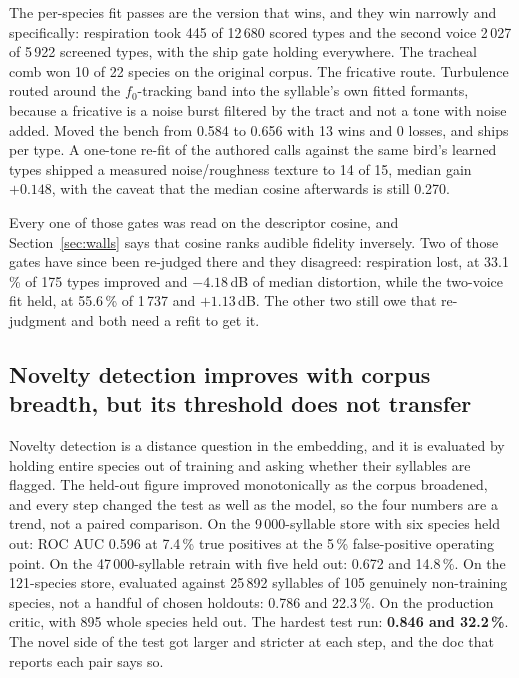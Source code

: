 \documentclass[10pt,twocolumn,a4paper]{article}
\begin{document}
The per-species fit passes are the version that wins, and they win narrowly and
specifically: respiration took 445 of 12\,680 scored types and the second voice 2\,027 of
5\,922 screened types, with the ship gate holding everywhere. The tracheal comb won 10 of 22
species on the original corpus. The fricative route. Turbulence routed around the
$f_0$-tracking band into the syllable's own fitted formants, because a fricative is a noise
burst filtered by the tract and not a tone with noise added. Moved the bench from 0.584 to
0.656 with 13 wins and 0 losses, and ships per type. A one-tone re-fit of the authored calls
against the same bird's learned types shipped a measured noise/roughness texture to 14 of 15,
median gain $+0.148$, with the caveat that the median cosine afterwards is still
0.270.

Every one of those gates was read on the descriptor cosine, and Section~\ref{sec:walls} says
that cosine ranks audible fidelity inversely. Two of those gates have since been re-judged
there and they disagreed: respiration lost, at 33.1\,\% of 175 types improved and $-4.18$\,dB of
median distortion, while the two-voice fit held, at 55.6\,\% of 1\,737 and $+1.13$\,dB. The other
two still owe that re-judgment and both need a refit to get it.

\subsection{Novelty detection improves with corpus breadth, but its threshold does not transfer}

Novelty detection is a distance question in the embedding, and it is evaluated by holding
entire species out of training and asking whether their syllables are flagged. The held-out
figure improved monotonically as the corpus broadened, and every step changed the test as well
as the model, so the four numbers are a trend, not a paired comparison. On the
9\,000-syllable store with six species held out: ROC AUC 0.596 at 7.4\,\% true positives at
the 5\,\% false-positive operating point. On the 47\,000-syllable retrain with five held out:
0.672 and 14.8\,\%. On the 121-species store, evaluated against 25\,892 syllables of 105
genuinely non-training species, not a handful of chosen holdouts: 0.786 and 22.3\,\%. On
the production critic, with 895 whole species held out. The hardest test run: \textbf{0.846
and 32.2\,\%}. The novel side of the test got larger and stricter at each step, and the doc
that reports each pair says so.
\end{document}
